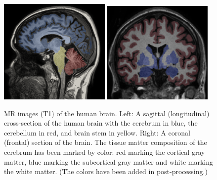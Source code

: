 \begin{figure}[t]
  \centering
  \includegraphics[width=0.48\textwidth]{./chapters/chp2/FIG/exp-brain.png}
  \includegraphics[width=0.48\textwidth]{./chapters/chp2/FIG/exp-matters.png}
  \caption{MR images (T1) of the human brain. Left: A sagittal
    (longitudinal) cross-section of the human brain with the cerebrum
    in blue, the cerebellum in red, and brain stem in yellow. Right: A
    coronal (frontal) section of the brain. The tissue matter
    composition of the cerebrum has been marked by color: red marking
    the cortical gray matter, blue marking the subcortical gray matter
    and white marking the white matter. (The colors have been added in
    post-processing.)}
  \label{fig:chp2:brain}
\end{figure}


